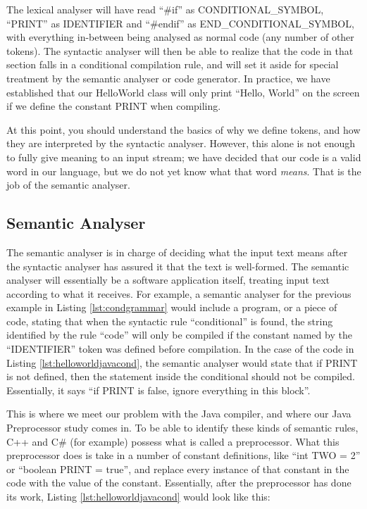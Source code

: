 The lexical analyser will have read ``\#if'' as CONDITIONAL_SYMBOL, ``PRINT'' as IDENTIFIER and ``\#endif'' as END_CONDITIONAL_SYMBOL, with everything in-between being analysed as normal code (any number of other tokens). The syntactic analyser will then be able to realize that the code in that section falls in a conditional compilation rule, and will set it aside for special treatment by the semantic analyser or code generator. In practice, we have established that our HelloWorld class will only print ``Hello, World'' on the screen if we define the constant PRINT when compiling.

At this point, you should understand the basics of why we define tokens, and how they are interpreted by the syntactic analyser. However, this alone is not enough to fully give meaning to an input stream; we have decided that our code is a valid word in our language, but we do not yet know what that word \emph{means}. That is the job of the semantic analyser.


\subsection{Semantic Analyser}
\label{sc:sem}

The semantic analyser is in charge of deciding what the input text means after the syntactic analyser has assured it that the text is well-formed. The semantic analyser will essentially be a software application itself, treating input text according to what it receives. For example, a semantic analyser for the previous example in Listing \ref{lst:condgrammar} would include a program, or a piece of code, stating that when the syntactic rule ``conditional'' is found, the string identified by the rule ``code'' will only be compiled if the constant named by the ``IDENTIFIER'' token was defined before compilation. In the case of the code in Listing \ref{lst:helloworldjavacond}, the semantic analyser would state that if PRINT is not defined, then the statement inside the conditional should not be compiled. Essentially, it says ``if PRINT is false, ignore everything in this block''.

This is where we meet our problem with the Java compiler, and where our Java Preprocessor study comes in. To be able to identify these kinds of semantic rules, C++ and C\# (for example) possess what is called a preprocessor. What this preprocessor does is take in a number of constant definitions, like ``int TWO = 2'' or ``boolean PRINT = true'', and replace every instance of that constant in the code with the value of the constant. Essentially, after the preprocessor has done its work, Listing \ref{lst:helloworldjavacond} would look like this:

